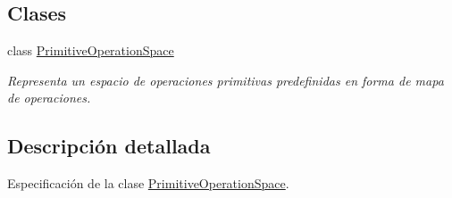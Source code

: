 \subsection*{Clases}
\begin{DoxyCompactItemize}
\item 
class \hyperlink{class_primitive_operation_space}{Primitive\+Operation\+Space}
\begin{DoxyCompactList}\small\item\em Representa un espacio de operaciones primitivas predefinidas en forma de mapa de operaciones. \end{DoxyCompactList}\end{DoxyCompactItemize}


\subsection{Descripción detallada}
Especificación de la clase \hyperlink{class_primitive_operation_space}{Primitive\+Operation\+Space}. 

